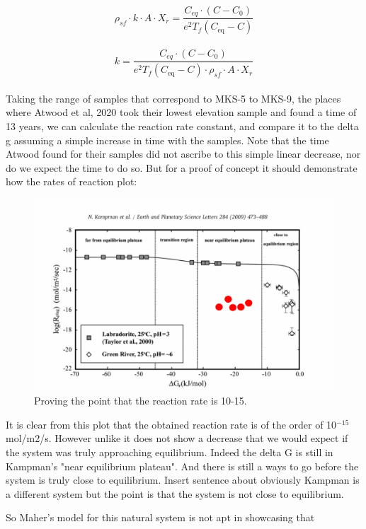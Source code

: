 \begin{equation}
    \rho_{sf} \cdot k \cdot A \cdot X_r = \frac{C_{eq} \cdot \left(C - C_0\right)}{e^2 T_f \left( C_{\text{eq}} - C \right)}
\end{equation}\\


\begin{equation}
     k = \frac{C_{eq} \cdot \left(C - C_0\right)}{e^2 T_f \left( C_{\text{eq}} - C \right) \cdot \rho_{sf} \cdot A \cdot X_r}
\end{equation}\\

Taking the range of samples that correspond to MKS-5 to MKS-9, the places where Atwood et al, 2020 took their lowest elevation sample and found a time of 13 years, we can calculate the reaction rate constant, and compare it to the delta g assuming a simple increase in time with the samples. Note that the time Atwood found for their samples did not ascribe to this simple linear decrease, nor do we expect the time to do so. But for a proof of concept it should demonstrate how the rates of reaction plot:\\


\begin{figure}[h]
    \centering
    \includegraphics[width=\textwidth]{example_rate_deltaG.pdf}
    \caption{Proving the point that the reaction rate is 10-15.}
    \label{fig:discussion7}
\end{figure}

\FloatBarrier

It is clear from this plot that the obtained reaction rate is of the order of 10$^{-15}$ mol/m2/s. However unlike it does not show a decrease that we would expect if the system was truly approaching equilibrium. Indeed the delta G is still in Kampman's "near equilibrium plateau". And there is still a ways to go before the system is truly close to equilibrium. Insert sentence about obviously Kampman is a different system but the point is that the system is not close to equilibrium.\\

\bsk

So Maher's model for this natural system is not apt in showcasing that 







\FloatBarrier


